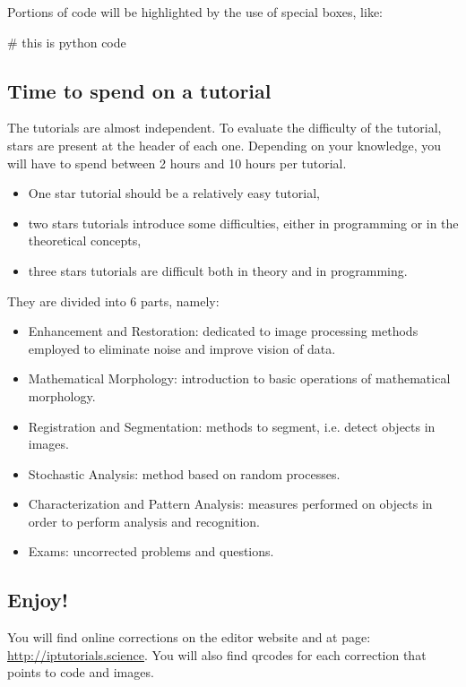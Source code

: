 Portions of code will be highlighted by the use of special boxes, like:
\begin{matlab}
\end{matlab}

\begin{python}
# this is python code
\end{python}


\subsection*{Time to spend on a tutorial}
The tutorials are almost independent. To evaluate the difficulty of the tutorial, stars are present at the header of each one. Depending on your knowledge, you will have to spend between 2 hours and 10 hours per tutorial.

\begin{itemize}
 \item One star tutorial should be a relatively easy tutorial,
 \item two stars tutorials introduce some difficulties, either in programming or in the theoretical concepts,
 \item three stars tutorials are difficult both in theory and in programming.
\end{itemize}


They are divided into 6 parts, namely:
\begin{itemize}
 \item Enhancement and Restoration: dedicated to image processing methods employed to eliminate noise and improve vision of data.
 \item Mathematical Morphology: introduction to basic operations of mathematical morphology. 
 \item Registration and Segmentation: methods to segment, i.e. detect objects in images.
 \item Stochastic Analysis: method based on random processes.

 \item Characterization and Pattern Analysis: measures performed on objects in order to perform analysis and recognition.
 \item Exams: uncorrected problems and questions.
\end{itemize}

\subsection*{Enjoy!}
You will find online corrections on the editor website and at page: \href{http://www.iptutorials.science}{http://iptutorials.science}. You will also find qrcodes for each correction that points to code and images.



